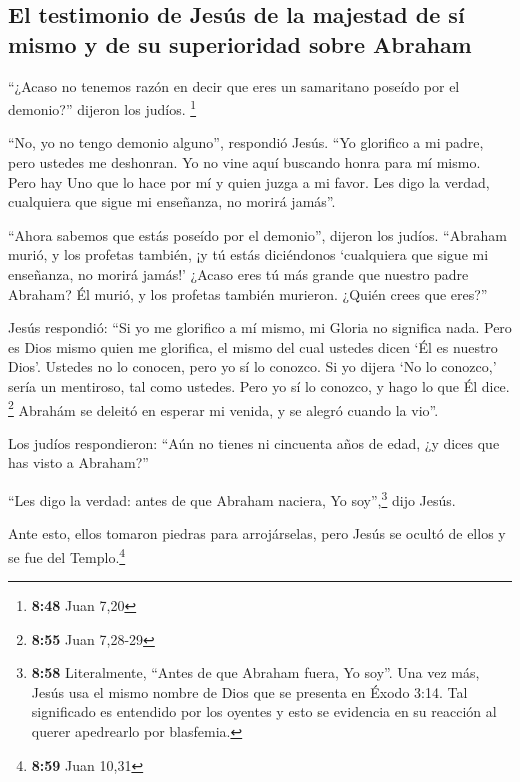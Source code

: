 \hypertarget{el-testimonio-de-jesuxfas-de-la-majestad-de-suxed-mismo-y-de-su-superioridad-sobre-abraham}{%
\subsection{El testimonio de Jesús de la majestad de sí mismo y de su
superioridad sobre
Abraham}\label{el-testimonio-de-jesuxfas-de-la-majestad-de-suxed-mismo-y-de-su-superioridad-sobre-abraham}}

 ``¿Acaso no tenemos razón en decir que eres un
samaritano poseído por el demonio?'' dijeron los judíos. \footnote{\textbf{8:48}
  Juan 7,20}

 ``No, yo no tengo demonio alguno'', respondió Jesús.
``Yo glorifico a mi padre, pero ustedes me deshonran.  Yo
no vine aquí buscando honra para mí mismo. Pero hay Uno que lo hace por
mí y quien juzga a mi favor.  Les digo la verdad,
cualquiera que sigue mi enseñanza, no morirá jamás''.

 ``Ahora sabemos que estás poseído por el demonio'',
dijeron los judíos. ``Abraham murió, y los profetas también, ¡y tú estás
diciéndonos `cualquiera que sigue mi enseñanza, no morirá jamás!'
 ¿Acaso eres tú más grande que nuestro padre Abraham? Él
murió, y los profetas también murieron. ¿Quién crees que eres?''

 Jesús respondió: ``Si yo me glorifico a mí mismo, mi
Gloria no significa nada. Pero es Dios mismo quien me glorifica, el
mismo del cual ustedes dicen `Él es nuestro Dios'. 
Ustedes no lo conocen, pero yo sí lo conozco. Si yo dijera `No lo
conozco,' sería un mentiroso, tal como ustedes. Pero yo sí lo conozco, y
hago lo que Él dice. \footnote{\textbf{8:55} Juan 7,28-29}
 Abrahám se deleitó en esperar mi venida, y se alegró
cuando la vio''.

 Los judíos respondieron: ``Aún no tienes ni cincuenta
años de edad, ¿y dices que has visto a Abraham?''

 ``Les digo la verdad: antes de que Abraham naciera, Yo
soy'',\footnote{\textbf{8:58} Literalmente, ``Antes de que Abraham
  fuera, Yo soy''. Una vez más, Jesús usa el mismo nombre de Dios que se
  presenta en Éxodo 3:14. Tal significado es entendido por los oyentes y
  esto se evidencia en su reacción al querer apedrearlo por blasfemia.}
dijo Jesús.

 Ante esto, ellos tomaron piedras para arrojárselas, pero
Jesús se ocultó de ellos y se fue del Templo.\footnote{\textbf{8:59}
  Juan 10,31}

